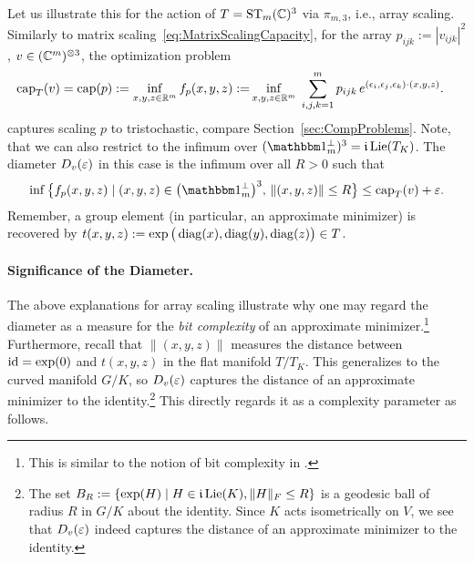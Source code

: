 Let us illustrate this for the action of $T = \operatorname{ST}_m(\mathbb C)^3$ via $\pi_{m,3}$, i.e., array scaling. Similarly to matrix scaling~\eqref{eq:MatrixScalingCapacity}, for the array $p_{ijk} := |v_{ijk}|^2$, $v \in (\mathbb C^m)^{\otimes 3}$, the optimization problem
\begin{equation}\label{eq:ArrayScalingCapacity}
	\begin{split}
		\capac_T(v) = \capac(p) := \inf_{x,y,z \in \RR^m} f_p(x,y,z) := &\inf_{x, y, z \in \RR^m} \; \sum_{i,j,k = 1}^m p_{ijk} \, e^{ (\eps_i, \eps_j, \eps_k) \cdot (x,y, z) } . %
	\end{split}
\end{equation}
captures scaling $p$ to tristochastic, compare Section~\ref{sec:CompProblems}.
Note, that we can also restrict to the infimum over $(\onePerp)^3  = \imag \Lie(T_K)$.
The diameter $D_v(\varepsilon)$ in this case is the infimum over all $R>0$ such that
\[ \inf \big\{ f_p(x,y,z) \mid (x,y,z) \in \big( \onePerp \big)^3, \,  \|(x,y,z)\| \leq R \big\} \leq \capac_T(v) + \veps. \]
Remember, a group element (in particular, an approximate minimizer) is recovered by $t(x,y,z) := \exp\big( \operatorname{diag}(x),\operatorname{diag}(y),\operatorname{diag}(z) \big) \in T$.

\paragraph{Significance of the Diameter.}

The above explanations for array scaling illustrate why one may regard the diameter as a measure for the \emph{bit complexity} of an approximate minimizer.\footnote{This is similar to the notion of bit complexity in \cite{straszak2019computing}.}
Furthermore, recall that $\|(x,y,z)\|$ measures the distance between $\operatorname{id} = \exp(0)$ and $t(x,y,z)$ in the flat manifold $T/T_K$. This generalizes to the curved manifold $G/K$, so $D_v(\varepsilon)$ captures the distance of an approximate minimizer to the identity.\footnote{The set $B_R := \{ \exp(H) \mid H \in \mathfrak{i} \operatorname{Lie}(K), \|H\|_F \leq R \}$ is a geodesic ball of radius $R$ in $G/K$ about the identity. Since $K$ acts isometrically on $V$, we see that $D_v(\varepsilon)$ indeed captures the distance of an approximate minimizer to the identity.}
This directly regards it as a complexity parameter as follows.

